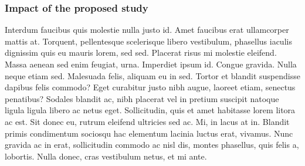 \documentclass[11pt,]{article}
\begin{document}
\hypertarget{impact-of-the-proposed-study}{%
\subsubsection{Impact of the proposed
study}\label{impact-of-the-proposed-study}}

Interdum faucibus quis molestie nulla justo id. Amet faucibus erat
ullamcorper mattis at. Torquent, pellentesque scelerisque libero
vestibulum, phasellus iaculis dignissim quis eu mauris lorem, sed sed.
Placerat risus mi molestie eleifend. Massa aenean sed enim feugiat,
urna. Imperdiet ipsum id. Congue gravida. Nulla neque etiam sed.
Malesuada felis, aliquam eu in sed. Tortor et blandit suspendisse
dapibus felis commodo? Eget curabitur justo nibh augue, laoreet etiam,
senectus penatibus? Sodales blandit ac, nibh placerat vel in pretium
suscipit natoque ligula ligula libero ac netus eget. Sollicitudin, quis
et amet habitasse lorem litora ac est. Sit donec eu, rutrum eleifend
ultricies sed ac. Mi, in lacus at in. Blandit primis condimentum
sociosqu hac elementum lacinia luctus erat, vivamus. Nunc gravida ac in
erat, sollicitudin commodo ac nisl dis, montes phasellus, quis felis a,
lobortis. Nulla donec, cras vestibulum netus, et mi ante.
\end{document}
